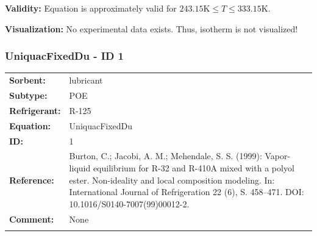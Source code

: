 \textbf{Validity:}
\newline
Equation is approximately valid for $243.15 \si{\kelvin} \leq T \leq 333.15 \si{\kelvin}$.
\newline

\textbf{Visualization:}
%
\newline
No experimental data exists. Thus, isotherm is not visualized!
%

\FloatBarrier
\newpage
\subsubsection{UniquacFixedDu - ID 1}
%
\begin{tabular}[l]{|lp{11.5cm}|}
\hline
\addlinespace

\textbf{Sorbent:} & lubricant \\
\textbf{Subtype:} & POE \\
\textbf{Refrigerant:} & R-125 \\
\textbf{Equation:} & UniquacFixedDu \\
\textbf{ID:} & 1 \\
\textbf{Reference:} & Burton, C.; Jacobi, A. M.; Mehendale, S. S. (1999): Vapor-liquid equilibrium for R-32 and R-410A mixed with a polyol ester. Non-ideality and local composition modeling. In: International Journal of Refrigeration 22 (6), S. 458–471. DOI: 10.1016/S0140-7007(99)00012-2. \\
\textbf{Comment:} & None \\

\addlinespace
\hline
\end{tabular}
\newline

